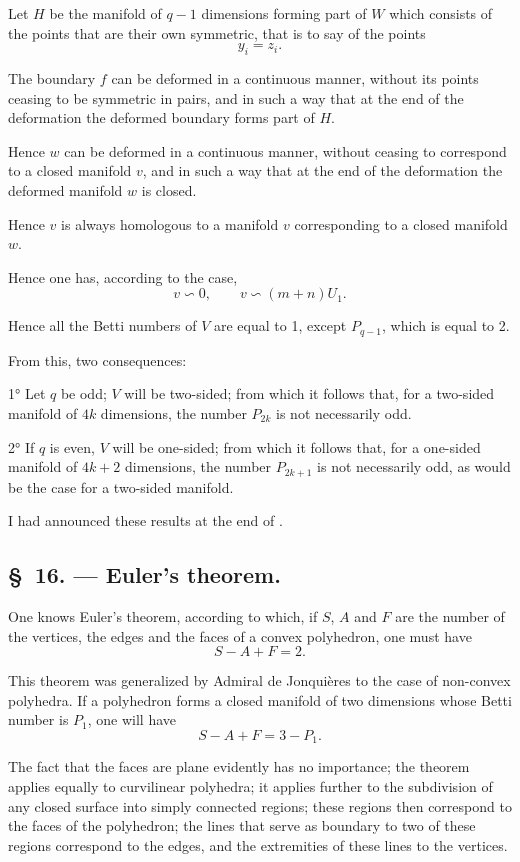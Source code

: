 \documentclass{article}
\begin{document}
Let $H$ be the manifold of $q - 1$ dimensions forming part of $W$ which consists of the points that are their own symmetric, that is to say of the points
\[ y_{i} = z_{i}. \]

The boundary $f$ can be deformed in a continuous manner, without its points ceasing to be symmetric in pairs, and in such a way that at the end of the deformation the deformed boundary forms part of $H$.

Hence $w$ can be deformed in a continuous manner, without ceasing to correspond to a closed manifold $v$, and in such a way that at the end of the deformation the deformed manifold $w$ is closed.

Hence $v$ is always homologous to a manifold $v$ corresponding to a closed manifold $w$.

Hence one has, according to the case,
\[ v \backsim 0, \qquad v \backsim (m + n)U_{1}. \]

Hence all the Betti numbers of $V$ are equal to 1, except $P_{q-1}$, which is equal to 2.

From this, two consequences:

1° Let $q$ be odd; $V$ will be two-sided; from which it follows that, for a two-sided manifold of $4k$ dimensions, the number $P_{2k}$ is not necessarily odd.

2° If $q$ is even, $V$ will be one-sided; from which it follows that, for a one-sided manifold of $4k + 2$ dimensions, the number $P_{2k+1}$ is not necessarily odd, as would be the case for a two-sided manifold.

I had announced these results at the end of .

\subsection*{\S~16. --- Euler's theorem.}

One knows Euler's theorem, according to which, if $S$, $A$ and $F$ are the number of the vertices, the edges and the faces of a convex polyhedron, one must have
\[ S - A + F = 2. \]

This theorem was generalized by Admiral de Jonquières to the case of non-convex polyhedra. If a polyhedron forms a closed manifold of two dimensions whose Betti number is $P_{1}$, one will have
\[ S - A + F = 3 - P_{1}. \]

The fact that the faces are plane evidently has no importance; the theorem applies equally to curvilinear polyhedra; it applies further to the subdivision of any closed surface into simply connected regions; these regions then correspond to the faces of the polyhedron; the lines that serve as boundary to two of these regions correspond to the edges, and the extremities of these lines to the vertices.
\end{document}
